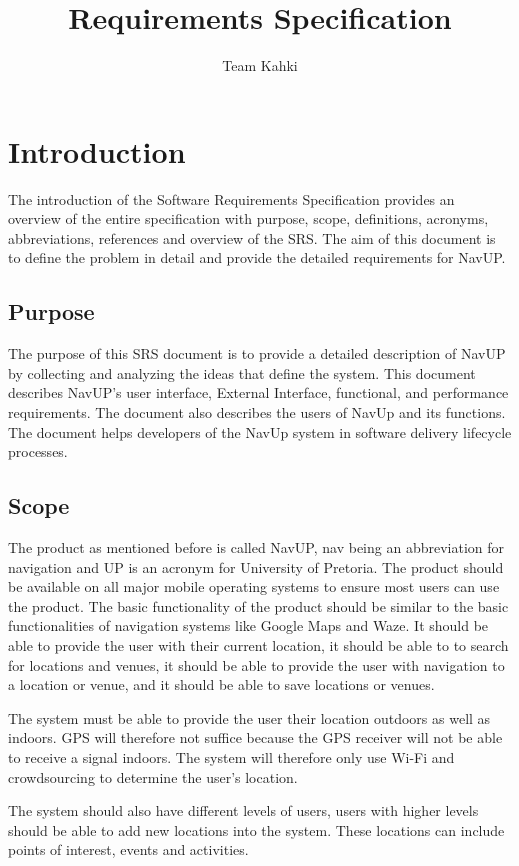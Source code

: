 \documentclass[11pt]{article}
\author{Team Kahki}
\title{Requirements Specification}
\begin{document}
	\setlength{\parskip}{6pt}
	
	
	
	\tableofcontents
	
	\newpage
	\section{Introduction}
	The introduction of the Software Requirements Specification provides an overview of the entire specification with purpose, scope, definitions, acronyms, abbreviations, references and overview of the SRS. The aim of this document is to define the problem in detail and provide the detailed requirements for NavUP.
	
	\subsection{Purpose}
	The purpose of this SRS document is to provide a detailed description of NavUP by collecting and analyzing the ideas that define the system. This document describes NavUP’s user interface, External Interface, functional, and performance requirements. The document also describes the users of NavUp and its functions. The document helps developers of the NavUp system in software delivery lifecycle processes. 

	\subsection{Scope}
	The product as mentioned before is called NavUP, nav being an abbreviation for navigation and UP is an acronym for University of Pretoria.
	The product should be available on all major mobile operating systems to ensure most users can use the product.
	The basic functionality of the product should be similar to the basic functionalities of navigation systems like Google Maps and Waze. It should be able to provide the user with their current location, it should be able to to search for locations and venues, it should be able to provide the user with navigation to a location or venue, and it should be able to save locations or venues. 
	
	The system must be able to provide the user their location outdoors as well as indoors. GPS will therefore not suffice because the GPS receiver will not be able to receive a signal indoors. The system will therefore only use Wi-Fi and crowdsourcing to determine the user's location.
	
	The system should also have different levels of users, users with higher levels should be able to add new locations into the system. These locations can include points of interest, events and activities.
	
\end{document}
